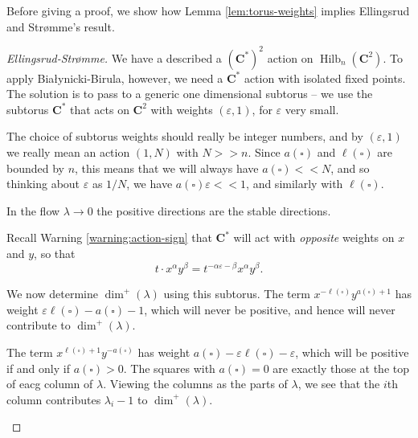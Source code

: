 \documentclass{amsart}[12pt]
\theoremstyle{definition}
\newcommand{\C}{\mathbf{C}}
\DeclareMathOperator{\Hilb}{Hilb}
\begin{document}
Before giving a proof, we show how Lemma \ref{lem:torus-weights} implies Ellingsrud and Str\o mme's result. 

\begin{proof}[Ellingsrud-Str\o mme]

  We have a described a $(\C^*)^2$ action on $\Hilb_n(\C^2)$.  To apply Bia\l ynicki-Birula, however, we need a $\C^*$ action with isolated fixed points.  The solution is to pass to a generic one dimensional subtorus -- we use the subtorus $\C^*$ that acts on $\C^2$ with weights $(\varepsilon,1)$, for $\varepsilon$ very small.

  The choice of subtorus weights should really be integer numbers, and by $(\varepsilon, 1)$ we really mean an action $(1, N)$ with $N>>n$. Since $a(\square)$ and $\ell(\square)$ are bounded by $n$, this means that we will always have $a(\square)<<N$, and so thinking about $\varepsilon$ as $1/N$, we have $a(\square)\varepsilon<<1$, and similarly with $\ell(\square)$.

In the flow $\lambda\to 0$ the positive directions are the stable directions.
  
Recall Warning \ref{warning:action-sign} that $\C^*$ will act with \emph{opposite} weights on $x$ and $y$, so that $$t\cdot x^\alpha y^\beta=t^{-\alpha\varepsilon-\beta}x^\alpha y^\beta.$$  

We now determine $\dim^+(\lambda)$ using this subtorus.  The term $x^{-\ell(\square)} y^{a(\square)+1}$ has weight $\varepsilon\ell(\square)-a(\square)-1$, which will never be positive, and hence will never contribute to $\dim^+(\lambda)$.

The term $x^{\ell(\square)+1}y^{-a(\square)}$ has weight $a(\square)-\varepsilon\ell(\square)-\varepsilon$, which will be positive if and only if $a(\square)>0$.  The squares with $a(\square)=0$ are exactly those at the top of eacg column of $\lambda$. Viewing the columns as the parts of $\lambda$, we see that the $i$th column contributes $\lambda_i-1$ to $\dim^+(\lambda)$.


\begin{center}
\end{center}

\end{proof}
\end{document}
